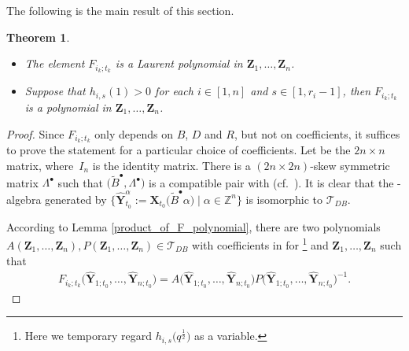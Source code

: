 \documentclass[11pt]{article}
\numberwithin{equation}{section}
\numberwithin{equation}{section}
\newtheorem{Theorem}{Theorem}[section]
\begin{document}
The following is the main result of this section.
\begin{Theorem}\label{t:F-polynomial}\qquad
\begin{itemize}\itemsep=0pt
 \item[$(1)$] The element $F_{i_k;t_k}$ is a Laurent polynomial in $\mathbf{Z}_1,\dots, \mathbf{Z}_n$.
 \item[$(2)$] Suppose that $h_{i,s}(1)>0$ for each $i\in [1,n]$ and $s\in [1,r_i-1]$, then $F_{i_k;t_k}$ is a polynomial in $\mathbf{Z}_1,\dots, \mathbf{Z}_n$.
\end{itemize}

\end{Theorem}
\begin{proof}
 Since $F_{i_k;t_k}$ only depends on $B$, $D$ and $R$, but not on coefficients, it suffices to prove the statement for a particular choice of coefficients. Let  be the $2n\times n$ matrix, where~$I_n$ is the identity matrix. There is a $(2n\times 2n)$-skew symmetric matrix $\Lambda^{\bullet}$ such that $\bigl(\tilde{B}^{\bullet},\Lambda^{\bullet}\bigr)$ is a compatible pair with  (cf.\ \cite[Example 0.5]{Berenstein_Zelevinsky2005}). It is clear that the -algebra generated by $\bigl\{\mathbf{\hat{Y}}_{t_0}^{\alpha}:=\mathbf{X}_{t_{0}}\bigl(\tilde{B}^{\bullet}\alpha\bigr)\mid \alpha\in\mathbb{Z}^{n}\bigr\}$ is isomorphic to $\mathcal{T}_{DB}$.

 According to Lemma \ref{product_of_F_polynomial}, there are two polynomials $A(\mathbf{Z}_{1},\dots,\mathbf{Z}_{n}),P(\mathbf{Z}_{1},\dots,\mathbf{Z}_{n})\in \mathcal{T}_{DB}$ with coefficients in  for \footnote{Here we temporary regard $h_{i,s}\bigl(q^{\frac{1}{2}}\bigr)$ as a variable.} and $\mathbf{Z}_{1},\dots,\mathbf{Z}_{n}$ such that
 \begin{align}\label{fraction_of_F-polynomial}
 F_{i_{k};t_{k}}\bigl(\mathbf{\hat{Y}}_{1;t_{0}},\dots,\mathbf{\hat{Y}}_{n;t_{0}}\bigr)=A\bigl(\mathbf{\hat{Y}}_{1;t_{0}},\dots,\mathbf{\hat{Y}}_{n;t_{0}}\bigr)P\bigl(\mathbf{\hat{Y}}_{1;t_{0}},\dots,\mathbf{\hat{Y}}_{n;t_{0}}\bigr)^{-1}.
 \end{align}



\end{proof}
\end{document}
